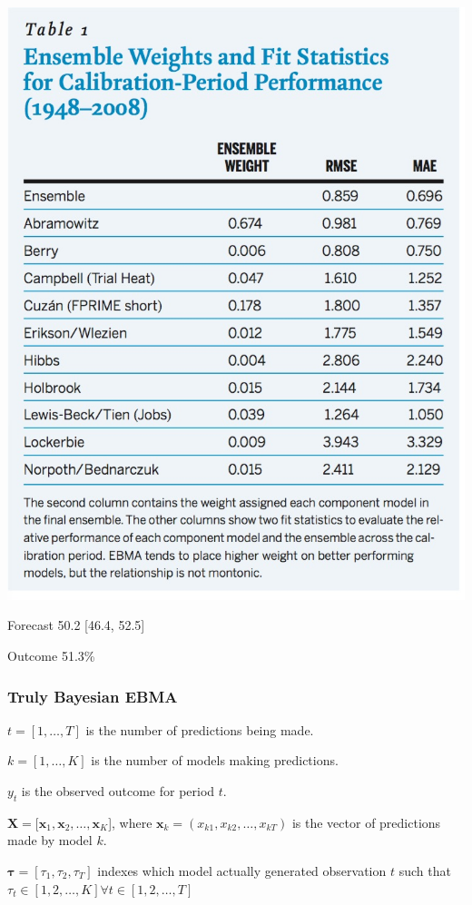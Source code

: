 \documentclass[xcolor=dvipsnames]{beamer}
\begin{document}
\begin{frame}

\begin{center}
\includegraphics[scale=.2]{Figure2}
\end{center}

\bi
\item Forecast 50.2 [46.4, 52.5]
\item Outcome 51.3\%
\ei

\end{frame}

\begin{frame}
\frametitle{Truly Bayesian EBMA}

\bi
\item $t=[1, \ldots, T]$ is the number of predictions being made.
\item $k=[1, \ldots, K]$ is the number of models making predictions.
\item $y_t$ is the observed outcome for period $t$.
\item $\mathbf{X}=[\mathbf{x}_1, \mathbf{x}_2, \ldots, \mathbf{x}_K$], where  $\mathbf{x}_k = (x_{k1},x_{k2}, \ldots, x_{kT})$ is the vector of predictions made by model $k$.
\item $\boldsymbol{\tau} = [\tau_1, \tau_2, \tau_T]$ indexes which model actually generated observation $t$ such that $\tau_t \in [1, 2, \ldots, K] \forall t \in [1, 2, \ldots, T]$
\ei
\end{frame}
\end{document}
